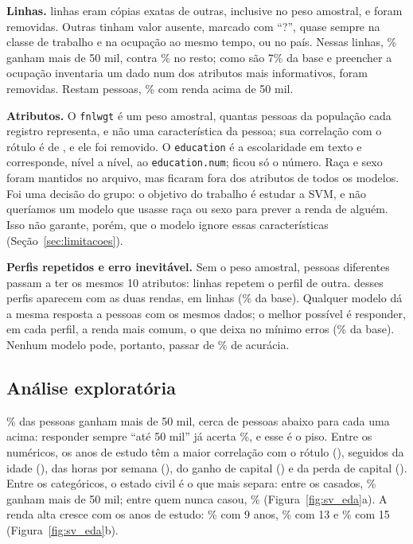 \textbf{Linhas.} \svDuplicadas{} linhas eram cópias exatas de outras, inclusive no peso amostral, e foram removidas. Outras \svAusentes{} tinham valor ausente, marcado com ``?'', quase sempre na classe de trabalho e na ocupação ao mesmo tempo, ou no país. Nessas linhas, \svPositivosAusentes\% ganham mais de 50 mil, contra \svPositivos\% no resto; como são 7\% da base e preencher a ocupação inventaria um dado num dos atributos mais informativos, foram removidas. Restam \svLinhas{} pessoas, \svPositivos\% com renda acima de 50 mil.

\textbf{Atributos.} O \texttt{fnlwgt} é um peso amostral, quantas pessoas da população cada registro representa, e não uma característica da pessoa; sua correlação com o rótulo é de \svCorrFnlwgt, e ele foi removido. O \texttt{education} é a escolaridade em texto e corresponde, nível a nível, ao \texttt{education.num}; ficou só o número. Raça e sexo foram mantidos no arquivo, mas ficaram fora dos atributos de todos os modelos. Foi uma decisão do grupo: o objetivo do trabalho é estudar a SVM, e não queríamos um modelo que usasse raça ou sexo para prever a renda de alguém. Isso não garante, porém, que o modelo ignore essas características (Seção~\ref{sec:limitacoes}).

\textbf{Perfis repetidos e erro inevitável.} Sem o peso amostral, pessoas diferentes passam a ter os mesmos 10 atributos: \svRepetemPerfil{} linhas repetem o perfil de outra. \svPerfisConflito{} desses perfis aparecem com as duas rendas, em \svLinhasConflito{} linhas (\svPctConflito\% da base). Qualquer modelo dá a mesma resposta a pessoas com os mesmos dados; o melhor possível é responder, em cada perfil, a renda mais comum, o que deixa no mínimo \svErrosIrred{} erros (\svIrredPct\% da base). Nenhum modelo pode, portanto, passar de \svTeto\% de acurácia.

\subsection{Análise exploratória}\label{sec:sv_eda}

\svPositivos\% das pessoas ganham mais de 50 mil, cerca de \svRazaoClasses{} pessoas abaixo para cada uma acima: responder sempre ``até 50 mil'' já acerta \svPiso\%, e esse é o piso. Entre os numéricos, os anos de estudo têm a maior correlação com o rótulo (\svCorrEstudo), seguidos da idade (\svCorrIdade), das horas por semana (\svCorrHoras), do ganho de capital (\svCorrGanho) e da perda de capital (\svCorrPerda). Entre os categóricos, o estado civil é o que mais separa: entre os casados, \svCasados\% ganham mais de 50 mil; entre quem nunca casou, \svNuncaCasou\% (Figura~\ref{fig:sv_eda}a). A renda alta cresce com os anos de estudo: \svEstudoNove\% com 9 anos, \svEstudoTreze\% com 13 e \svEstudoQuinze\% com 15 (Figura~\ref{fig:sv_eda}b).

